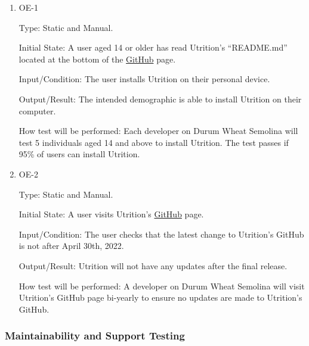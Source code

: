 \documentclass[12pt, titlepage]{article}
\begin{document}
	\begin{enumerate}
		
		\item{OE-1} 
		
		Type: Static and Manual.
		
		Initial State: A user aged 14 or older has read Utrition’s “README.md” located at the bottom of the \href{https://github.com/jeff-rey-wang/utrition/}{GitHub} page.
		
		Input/Condition: The user installs Utrition on their personal device.
		
		Output/Result: The intended demographic is able to install Utrition on their computer.
		
		How test will be performed: Each developer on Durum Wheat Semolina will test 5 individuals aged 14 and above to install Utrition. The test passes if 95\% of users can install Utrition.
		
		\item{OE-2} 
		
		Type: Static and Manual.
		
		Initial State: A user visits Utrition’s \href{https://github.com/jeff-rey-wang/utrition/}{GitHub} page.
		
		Input/Condition: The user checks that the latest change to Utrition’s GitHub is not after April 30th, 2022.
		
		Output/Result: Utrition will not have any updates after the final release.
		
		How test will be performed: A developer on Durum Wheat Semolina will visit Utrition’s GitHub page bi-yearly to ensure no updates are made to Utrition’s GitHub.
		
	\end{enumerate}
	
	\subsubsection{Maintainability and Support Testing}
	
	
\end{document}
